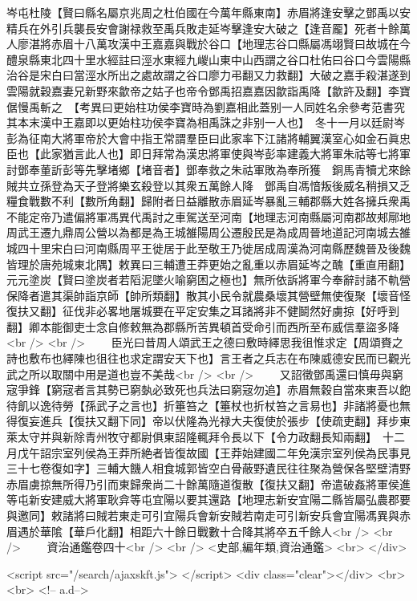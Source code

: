岑屯杜陵【賢曰縣名屬京兆周之杜伯國在今萬年縣東南】赤眉將逢安擊之鄧禹以安精兵在外引兵襲長安會謝禄救至禹兵敗走延岑擊逢安大破之【逢音龎】死者十餘萬人廖湛將赤眉十八萬攻漢中王嘉嘉與戰於谷口【地理志谷口縣屬馮翊賢曰故城在今醴泉縣東北四十里水經註曰涇水東經九嵕山東中山西謂之谷口杜佑曰谷口今雲陽縣治谷是宋白曰當涇水所出之處故謂之谷口廖力弔翻又力救翻】大破之嘉手殺湛遂到雲陽就穀嘉妻兄新野來歙帝之姑子也帝令鄧禹招嘉嘉因歙詣禹降【歙許及翻】李寶倨慢禹斬之　【考異曰更始柱功侯李寶時為劉嘉相此蓋别一人同姓名余參考范書究其本末漢中王嘉即以更始柱功侯李寶為相禹誅之非别一人也】　冬十一月以廷尉岑彭為征南大將軍帝於大會中指王常謂羣臣曰此家率下江諸將輔翼漢室心如金石眞忠臣也【此家猶言此人也】即日拜常為漢忠將軍使與岑彭率建義大將軍朱祜等七將軍討鄧奉董訢彭等先擊堵鄉【堵音者】鄧奉救之朱祜軍敗為奉所獲　銅馬青犢尤來餘賊共立孫登為天子登將樂玄殺登以其衆五萬餘人降　鄧禹自馮愔叛後威名稍損又乏糧食戰數不利【數所角翻】歸附者日益離散赤眉延岑暴亂三輔郡縣大姓各擁兵衆禹不能定帝乃遣偏將軍馮異代禹討之車駕送至河南【地理志河南縣屬河南郡故郟鄏地周武王遷九鼎周公營以為都是為王城雒陽周公遷殷民是為成周晉地道記河南城去雒城四十里宋白曰河南縣周平王徙居于此至敬王乃徙居成周漢為河南縣歷魏晉及後魏皆理於唐苑城東北隅】敕異曰三輔遭王莽更始之亂重以赤眉延岑之醜【重直用翻】元元塗炭【賢曰塗炭者若䧟泥墜火喻窮困之極也】無所依訴將軍今奉辭討諸不軌營保降者遣其渠帥詣京師【帥所類翻】散其小民令就農桑壞其營壁無使復聚【壞音怪復扶又翻】征伐非必畧地屠城要在平定安集之耳諸將非不健鬬然好虜掠【好呼到翻】卿本能御吏士念自修敕無為郡縣所苦異頓首受命引而西所至布威信羣盜多降<br />
<br />
　　臣光曰昔周人頌武王之德曰敷時繹思我徂惟求定【周頌賚之詩也敷布也繹陳也徂往也求定謂安天下也】言王者之兵志在布陳威德安民而已觀光武之所以取關中用是道也豈不美哉<br />
<br />
　　又詔徵鄧禹還曰慎毋與窮宼爭鋒【窮宼者言其勢已窮埶必致死也兵法曰窮宼勿追】赤眉無穀自當來東吾以飽待飢以逸待勞【孫武子之言也】折箠笞之【箠杖也折杖笞之言易也】非諸將憂也無得復妄進兵【復扶又翻下同】帝以伏隆為光禄大夫復使於張步【使疏吏翻】拜步東萊太守并與新除青州牧守都尉俱東詔隆輒拜令長以下【令力政翻長知兩翻】　十二月戊午詔宗室列侯為王莽所絶者皆復故國【王莽始建國二年免漢宗室列侯為民事見三十七卷復如字】三輔大饑人相食城郭皆空白骨蔽野遺民往往聚為營保各堅壁清野赤眉虜掠無所得乃引而東歸衆尚二十餘萬隨道復散【復扶又翻】帝遣破姦將軍侯進等屯新安建威大將軍耿弇等屯宜陽以要其還路【地理志新安宜陽二縣皆屬弘農郡要與邀同】敕諸將曰賊若東走可引宜陽兵會新安賊若南走可引新安兵會宜陽馮異與赤眉遇於華隂【華戶化翻】相距六十餘日戰數十合降其將卒五千餘人<br />
<br />
　　資治通鑑卷四十<br />
<br />
<史部,編年類,資治通鑑>  <br>
   </div> 

<script src="/search/ajaxskft.js"> </script>
 <div class="clear"></div>
<br>
<br>
 <!-- a.d-->

